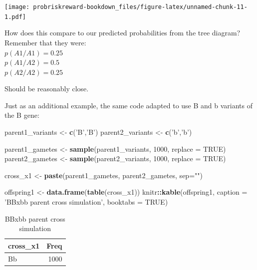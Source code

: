 \documentclass[]{book}
\newenvironment{Shaded}{\begin{snugshade}}{\end{snugshade}}
\newcommand{\KeywordTok}[1]{\textcolor[rgb]{0.13,0.29,0.53}{\textbf{#1}}}
\newcommand{\DataTypeTok}[1]{\textcolor[rgb]{0.13,0.29,0.53}{#1}}
\newcommand{\DecValTok}[1]{\textcolor[rgb]{0.00,0.00,0.81}{#1}}
\newcommand{\StringTok}[1]{\textcolor[rgb]{0.31,0.60,0.02}{#1}}
\newcommand{\OtherTok}[1]{\textcolor[rgb]{0.56,0.35,0.01}{#1}}
\newcommand{\OperatorTok}[1]{\textcolor[rgb]{0.81,0.36,0.00}{\textbf{#1}}}
\newcommand{\NormalTok}[1]{#1}
\theoremstyle{definition}
\theoremstyle{definition}
\theoremstyle{definition}
\theoremstyle{remark}
\begin{document}
\texttt{[image: probriskreward-bookdown\_files/figure-latex/unnamed-chunk-11-1.pdf]}

How does this compare to our predicted probabilities from the tree
diagram?\\
Remember that they were:\\
\(p(A1/A1) = 0.25\)\\
\(p(A1/A2) = 0.5\)\\
\(p(A2/A2) = 0.25\)

Should be reasonably close.

Just as an additional example, the same code adapted to use B and b
variants of the B gene:

\begin{Shaded}
\begin{Highlighting}[]
\NormalTok{parent1_variants <-}\StringTok{ }\KeywordTok{c}\NormalTok{(}\StringTok{'B'}\NormalTok{,}\StringTok{'B'}\NormalTok{)}
\NormalTok{parent2_variants <-}\StringTok{ }\KeywordTok{c}\NormalTok{(}\StringTok{'b'}\NormalTok{,}\StringTok{'b'}\NormalTok{)}

\NormalTok{parent1_gametes <-}\StringTok{ }\KeywordTok{sample}\NormalTok{(parent1_variants, }\DecValTok{1000}\NormalTok{, }\DataTypeTok{replace =} \OtherTok{TRUE}\NormalTok{)}
\NormalTok{parent2_gametes <-}\StringTok{ }\KeywordTok{sample}\NormalTok{(parent2_variants, }\DecValTok{1000}\NormalTok{, }\DataTypeTok{replace =} \OtherTok{TRUE}\NormalTok{)}

\NormalTok{cross_x1 <-}\StringTok{ }\KeywordTok{paste}\NormalTok{(parent1_gametes, parent2_gametes, }\DataTypeTok{sep=}\StringTok{""}\NormalTok{)}

\NormalTok{offspring1 <-}\StringTok{ }\KeywordTok{data.frame}\NormalTok{(}\KeywordTok{table}\NormalTok{(cross_x1))}
\NormalTok{knitr}\OperatorTok{::}\KeywordTok{kable}\NormalTok{(offspring1, }\DataTypeTok{caption =} \StringTok{'BBxbb parent cross simulation'}\NormalTok{, }\DataTypeTok{booktabs =} \OtherTok{TRUE}\NormalTok{)}
\end{Highlighting}
\end{Shaded}

\begin{table}

\caption{\label{tab:unnamed-chunk-12}BBxbb parent cross simulation}
\centering
\begin{tabular}[t]{lr}
\toprule
cross\_x1 & Freq\\
\midrule
Bb & 1000\\
\bottomrule
\end{tabular}
\end{table}
\end{document}

